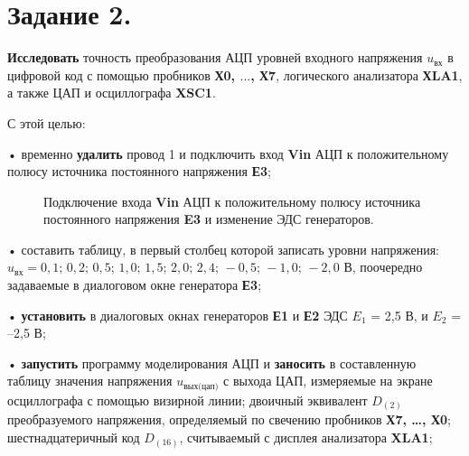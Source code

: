 \documentclass[spec, och, otchet, hidelinks]{SCWorks}
\begin{document}
\newpage

\section*{Задание 2.}

\textbf{Исследовать} точность преобразования АЦП уровней входного напряжения $u_\text{вх}$ в цифровой код с помощью пробников \textbf{Х0, $\dots$, Х7}, 
логического анализатора \textbf{ХLA1}, а также ЦАП и осциллографа \textbf{XSC1}.
\par С этой целью:

• временно \textbf{удалить} провод 1 и подключить вход \textbf{Vin} АЦП к положительному полюсу источника постоянного напряжения \textbf{Е3};

\begin{figure}[h]
	\caption{Подключение входа \textbf{Vin} АЦП к положительному полюсу источника постоянного напряжения \textbf{E3} и изменение ЭДС генераторов.}
\end{figure}

• составить таблицу, в первый столбец которой записать уровни напряжения: $ u_\text{вх} = 0,1; \, 0,2; \, 0,5; \, 1,0; \, 1,5; \, 2,0; \, 2,4; \, 
-0,5; \, -1,0; \, -2,0 $ В, поочередно задаваемые в диалоговом окне генератора \textbf{Е3}; 

• \textbf{установить} в диалоговых окнах генераторов \textbf{Е1} и \textbf{Е2} ЭДС $E_1$ = 2,5 В, и $E_2$ = –2,5 В;

• \textbf{запустить} программу моделирования АЦП и \textbf{заносить} в составленную таблицу значения напряжения $u_\text{вых(цап)}$ с выхода ЦАП, 
измеряемые на экране осциллографа с помощью визирной линии; двоичный эквивалент $D_{(2)}$ преобразуемого напряжения, определяемый по свечению пробников 
\textbf{Х7, \dots, Х0}; шестнадцатеричный код $D_{(16)}$, считываемый с дисплея анализатора \textbf{XLA1};
\end{document}
